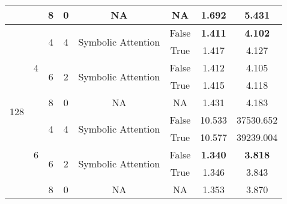 \begin{tabular}{@{}|c|c|c|c|c|c|c|c|@{}}
                        &                    & 8                  & 0                  & NA                                         & NA           & 1.692          & 5.431          \\ \hline
\multirow{10}{*}{128} & \multirow{5}{*}{4} & \multirow{2}{*}{4} & \multirow{2}{*}{4} & \multirow{2}{*}{Symbolic Attention}        & False        & \textbf{1.411} & \textbf{4.102} \\
                        &                    &                    &                    &                                            & True         & 1.417          & 4.127          \\ \cline{3-8} 
                        &                    & \multirow{2}{*}{6} & \multirow{2}{*}{2} & \multirow{2}{*}{Symbolic Attention}        & False        & 1.412          & 4.105          \\
                        &                    &                    &                    &                                            & True         & 1.415          & 4.118          \\ \cline{3-8} 
                        &                    & 8                  & 0                  & NA                                         & NA           & 1.431          & 4.183          \\ \cline{2-8} 
                        & \multirow{5}{*}{6} & \multirow{2}{*}{4} & \multirow{2}{*}{4} & \multirow{2}{*}{Symbolic Attention}        & False        & 10.533         & 37530.652      \\
                        &                    &                    &                    &                                            & True         & 10.577         & 39239.004      \\ \cline{3-8} 
                        &                    & \multirow{2}{*}{6} & \multirow{2}{*}{2} & \multirow{2}{*}{Symbolic Attention}        & False        & \textbf{1.340} & \textbf{3.818} \\
                        &                    &                    &                    &                                            & True         & 1.346          & 3.843          \\ \cline{3-8} 
                        &                    & 8                  & 0                  & NA                                         & NA           & 1.353          & 3.870          \\ \bottomrule
\end{tabular}%